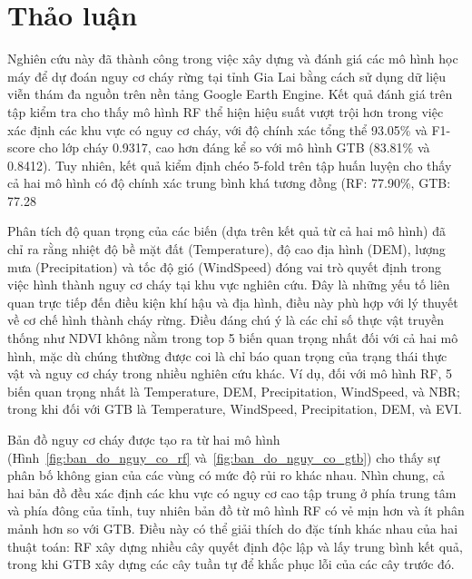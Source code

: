 \documentclass{article}
\begin{document}
\section{Thảo luận} %
Nghiên cứu này đã thành công trong việc xây dựng và đánh giá các mô hình học máy để dự đoán nguy cơ cháy rừng tại tỉnh Gia Lai bằng cách sử dụng dữ liệu viễn thám đa nguồn trên nền tảng Google Earth Engine. Kết quả đánh giá trên tập kiểm tra cho thấy mô hình RF thể hiện hiệu suất vượt trội hơn trong việc xác định các khu vực có nguy cơ cháy, với độ chính xác tổng thể 93.05\% và F1-score cho lớp cháy 0.9317, cao hơn đáng kể so với mô hình GTB (83.81\% và 0.8412). Tuy nhiên, kết quả kiểm định chéo 5-fold trên tập huấn luyện cho thấy cả hai mô hình có độ chính xác trung bình khá tương đồng (RF: 77.90\%, GTB: 77.28%

Phân tích độ quan trọng của các biến (dựa trên kết quả từ cả hai mô hình) đã chỉ ra rằng nhiệt độ bề mặt đất (Temperature), độ cao địa hình (DEM), lượng mưa (Precipitation) và tốc độ gió (WindSpeed) đóng vai trò quyết định trong việc hình thành nguy cơ cháy tại khu vực nghiên cứu. Đây là những yếu tố liên quan trực tiếp đến điều kiện khí hậu và địa hình, điều này phù hợp với lý thuyết về cơ chế hình thành cháy rừng. Điều đáng chú ý là các chỉ số thực vật truyền thống như NDVI không nằm trong top 5 biến quan trọng nhất đối với cả hai mô hình, mặc dù chúng thường được coi là chỉ báo quan trọng của trạng thái thực vật và nguy cơ cháy trong nhiều nghiên cứu khác. Ví dụ, đối với mô hình RF, 5 biến quan trọng nhất là Temperature, DEM, Precipitation, WindSpeed, và NBR; trong khi đối với GTB là Temperature, WindSpeed, Precipitation, DEM, và EVI.

Bản đồ nguy cơ cháy được tạo ra từ hai mô hình (Hình~\ref{fig:ban_do_nguy_co_rf} và~\ref{fig:ban_do_nguy_co_gtb}) cho thấy sự phân bố không gian của các vùng có mức độ rủi ro khác nhau. Nhìn chung, cả hai bản đồ đều xác định các khu vực có nguy cơ cao tập trung ở phía trung tâm và phía đông của tỉnh, tuy nhiên bản đồ từ mô hình RF có vẻ mịn hơn và ít phân mảnh hơn so với GTB. Điều này có thể giải thích do đặc tính khác nhau của hai thuật toán: RF xây dựng nhiều cây quyết định độc lập và lấy trung bình kết quả, trong khi GTB xây dựng các cây tuần tự để khắc phục lỗi của các cây trước đó.
\end{document}
